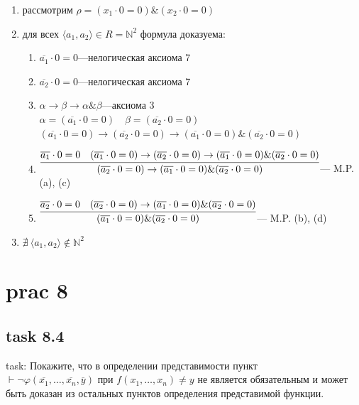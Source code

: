 \documentclass[12pt]{article}
\begin{document}
\begin{enumerate}
    \item рассмотрим $\rho = (x_1 \cdot 0 = 0)\&(x_2 \cdot 0 = 0)$
    \item для всех $\langle a_1, a_2 \rangle \in R = \mathbb{N}^2$ формула доказуема:
    
    \begin{enumerate}
        \item $\overline{a_1} \cdot 0 = 0$\quad ---\quad нелогическая аксиома 7
        \item $\overline{a_2} \cdot 0 = 0$\quad ---\quad нелогическая аксиома 7
        \item $\alpha \rightarrow \beta \rightarrow \alpha \& \beta$\quad ---\quad аксиома 3\\
        $\alpha = (\overline{a_1} \cdot 0 = 0)\quad \beta=(\overline{a_2} \cdot 0 = 0)$\\
        $(\overline{a_1} \cdot 0 = 0) \rightarrow (\overline{a_2} \cdot 0 = 0) \rightarrow (\overline{a_1} \cdot 0 = 0) \& (\overline{a_2} \cdot 0 = 0)$
        \item $\infer{(\overline{a_2} \cdot 0 = 0) \rightarrow (\overline{a_1} \cdot 0 = 0) \& (\overline{a_2} \cdot 0 = 0)}{\overline{a_1} \cdot 0 = 0\quad (\overline{a_1} \cdot 0 = 0) \rightarrow (\overline{a_2} \cdot 0 = 0) \rightarrow (\overline{a_1} \cdot 0 = 0) \& (\overline{a_2} \cdot 0 = 0)}$\quad --- \quad M.P. (a), (c)
        \item $\infer{(\overline{a_1} \cdot 0 = 0) \& (\overline{a_2} \cdot 0 = 0)}{\overline{a_2} \cdot 0 = 0\quad (\overline{a_2} \cdot 0 = 0) \rightarrow (\overline{a_1} \cdot 0 = 0) \& (\overline{a_2} \cdot 0 = 0)}$\quad --- \quad M.P. (b), (d)
    \end{enumerate}

    \item $\nexists\ \langle a_1, a_2 \rangle \not\in\mathbb{N}^2$
\end{enumerate}

\section*{prac 8}

\subsection*{task 8.4}

task: Покажите, что в определении представимости пункт\\
$\vdash\neg\varphi(\overline{x_1},\dots,\overline{x_n},\overline{y})$ при $f(x_1,\dots,x_n) \ne y$ не является
обязательным и может быть доказан из остальных пунктов определения представимой функции.\\
\end{document}

